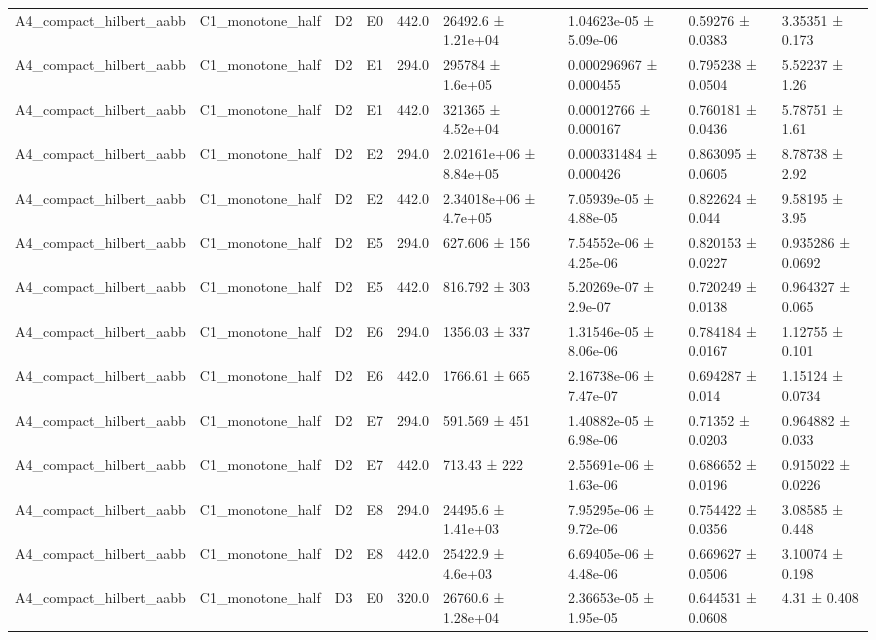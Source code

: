 \begin{table}
\begin{tabular}{lllllllll}
A4\_compact\_hilbert\_aabb & C1\_monotone\_half & D2 & E0 & 442.0 & 26492.6 ± 1.21e+04 & 1.04623e-05 ± 5.09e-06 & 0.59276 ± 0.0383 & 3.35351 ± 0.173 \\
A4\_compact\_hilbert\_aabb & C1\_monotone\_half & D2 & E1 & 294.0 & 295784 ± 1.6e+05 & 0.000296967 ± 0.000455 & 0.795238 ± 0.0504 & 5.52237 ± 1.26 \\
A4\_compact\_hilbert\_aabb & C1\_monotone\_half & D2 & E1 & 442.0 & 321365 ± 4.52e+04 & 0.00012766 ± 0.000167 & 0.760181 ± 0.0436 & 5.78751 ± 1.61 \\
A4\_compact\_hilbert\_aabb & C1\_monotone\_half & D2 & E2 & 294.0 & 2.02161e+06 ± 8.84e+05 & 0.000331484 ± 0.000426 & 0.863095 ± 0.0605 & 8.78738 ± 2.92 \\
A4\_compact\_hilbert\_aabb & C1\_monotone\_half & D2 & E2 & 442.0 & 2.34018e+06 ± 4.7e+05 & 7.05939e-05 ± 4.88e-05 & 0.822624 ± 0.044 & 9.58195 ± 3.95 \\
A4\_compact\_hilbert\_aabb & C1\_monotone\_half & D2 & E5 & 294.0 & 627.606 ± 156 & 7.54552e-06 ± 4.25e-06 & 0.820153 ± 0.0227 & 0.935286 ± 0.0692 \\
A4\_compact\_hilbert\_aabb & C1\_monotone\_half & D2 & E5 & 442.0 & 816.792 ± 303 & 5.20269e-07 ± 2.9e-07 & 0.720249 ± 0.0138 & 0.964327 ± 0.065 \\
A4\_compact\_hilbert\_aabb & C1\_monotone\_half & D2 & E6 & 294.0 & 1356.03 ± 337 & 1.31546e-05 ± 8.06e-06 & 0.784184 ± 0.0167 & 1.12755 ± 0.101 \\
A4\_compact\_hilbert\_aabb & C1\_monotone\_half & D2 & E6 & 442.0 & 1766.61 ± 665 & 2.16738e-06 ± 7.47e-07 & 0.694287 ± 0.014 & 1.15124 ± 0.0734 \\
A4\_compact\_hilbert\_aabb & C1\_monotone\_half & D2 & E7 & 294.0 & 591.569 ± 451 & 1.40882e-05 ± 6.98e-06 & 0.71352 ± 0.0203 & 0.964882 ± 0.033 \\
A4\_compact\_hilbert\_aabb & C1\_monotone\_half & D2 & E7 & 442.0 & 713.43 ± 222 & 2.55691e-06 ± 1.63e-06 & 0.686652 ± 0.0196 & 0.915022 ± 0.0226 \\
A4\_compact\_hilbert\_aabb & C1\_monotone\_half & D2 & E8 & 294.0 & 24495.6 ± 1.41e+03 & 7.95295e-06 ± 9.72e-06 & 0.754422 ± 0.0356 & 3.08585 ± 0.448 \\
A4\_compact\_hilbert\_aabb & C1\_monotone\_half & D2 & E8 & 442.0 & 25422.9 ± 4.6e+03 & 6.69405e-06 ± 4.48e-06 & 0.669627 ± 0.0506 & 3.10074 ± 0.198 \\
A4\_compact\_hilbert\_aabb & C1\_monotone\_half & D3 & E0 & 320.0 & 26760.6 ± 1.28e+04 & 2.36653e-05 ± 1.95e-05 & 0.644531 ± 0.0608 & 4.31 ± 0.408 \\

\end{tabular}
\end{table}
